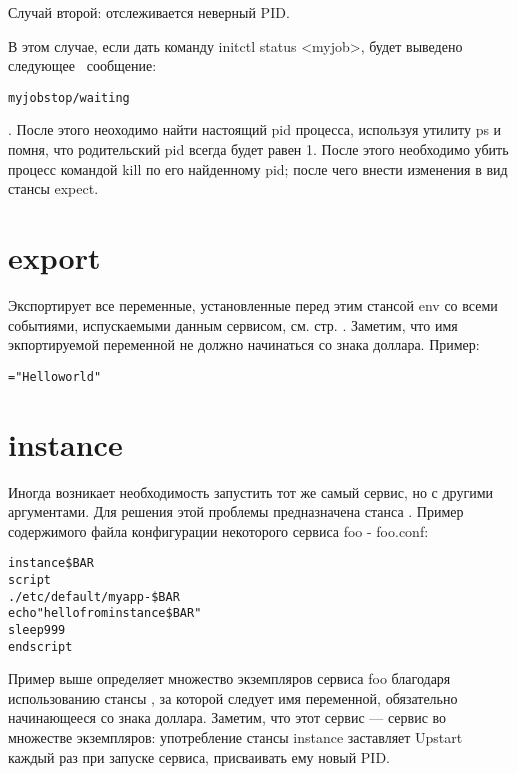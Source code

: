 Случай второй: отслеживается неверный PID.

В этом случае, если дать команду initctl status <myjob>, будет выведено следующее ~сообщение: \begin{alltt}
myjob stop/waiting
\end{alltt}. После этого неоходимо найти настоящий pid процесса, используя утилиту ps и помня, что родительский pid всегда будет равен 1. После этого необходимо убить процесс командой kill по его найденному pid; после чего внести изменения в вид стансы expect.
\section{export}
Экспортирует все переменные, установленные перед этим стансой env со всеми событиями, испускаемыми данным сервисом, см. стр. \pageref{cpt:job_lifecycle}. Заметим, что имя экпортируемой переменной не должно начинаться со знака доллара.
Пример: \begin{alltt}
="Hello world"
\end{alltt} 
\section{instance}
Иногда возникает необходимость запустить тот же самый сервис, но с другими аргументами. Для решения этой проблемы предназначена станса . Пример содержимого файла конфигурации некоторого сервиса foo - foo.conf: \begin{alltt}
instance \$BAR
script
. /etc/default/myapp-\${BAR}
echo "hello from instance \$BAR"
sleep 999
end script
\end{alltt} Пример выше определяет множество экземпляров сервиса foo благодаря использованию стансы , за которой следует имя переменной, обязательно начинающееся со знака доллара. 
Заметим, что этот сервис --- сервис во множестве экземпляров: употребление стансы instance заставляет Upstart каждый раз при запуске сервиса, присваивать ему новый PID. 

